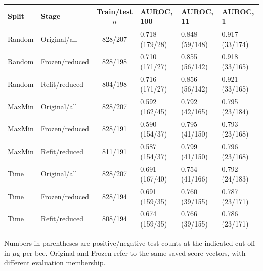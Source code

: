 \begin{center}
\footnotesize
\begin{tabularx}{\linewidth}{llcXXX}
\toprule
Split & Stage & Train/test $n$ & AUROC, 100 & AUROC, 11 & AUROC, 1 \\
\midrule
Random & Original/all & 828/207 & 0.718 (179/28) & 0.848 (59/148) & 0.917 (33/174) \\
Random & Frozen/reduced & 828/198 & 0.710 (171/27) & 0.855 (56/142) & 0.918 (33/165) \\
Random & Refit/reduced & 804/198 & 0.716 (171/27) & 0.856 (56/142) & 0.921 (33/165) \\
MaxMin & Original/all & 828/207 & 0.592 (162/45) & 0.792 (42/165) & 0.795 (23/184) \\
MaxMin & Frozen/reduced & 828/191 & 0.590 (154/37) & 0.795 (41/150) & 0.793 (23/168) \\
MaxMin & Refit/reduced & 811/191 & 0.587 (154/37) & 0.799 (41/150) & 0.796 (23/168) \\
Time & Original/all & 828/207 & 0.691 (167/40) & 0.754 (41/166) & 0.792 (24/183) \\
Time & Frozen/reduced & 828/194 & 0.691 (159/35) & 0.760 (39/155) & 0.787 (23/171) \\
Time & Refit/reduced & 808/194 & 0.674 (159/35) & 0.766 (39/155) & 0.786 (23/171) \\
\bottomrule
\end{tabularx}
\end{center}
Numbers in parentheses are positive/negative test counts at the indicated cut-off in $\mu$g per bee. Original and Frozen refer to the same saved score vectors, with different evaluation membership.

